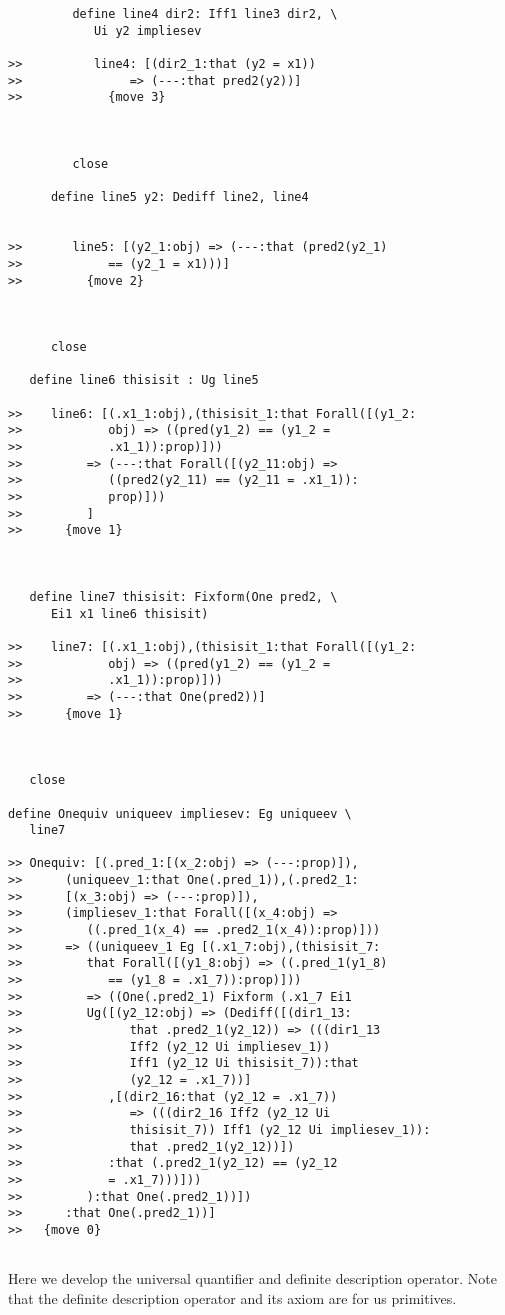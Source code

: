 \documentclass[12pt]{article}
\begin{document}
\begin{verbatim}
         define line4 dir2: Iff1 line3 dir2, \
            Ui y2 impliesev

>>          line4: [(dir2_1:that (y2 = x1))
>>               => (---:that pred2(y2))]
>>            {move 3}



         close

      define line5 y2: Dediff line2, line4


>>       line5: [(y2_1:obj) => (---:that (pred2(y2_1)
>>            == (y2_1 = x1)))]
>>         {move 2}



      close

   define line6 thisisit : Ug line5

>>    line6: [(.x1_1:obj),(thisisit_1:that Forall([(y1_2:
>>            obj) => ((pred(y1_2) == (y1_2 =
>>            .x1_1)):prop)]))
>>         => (---:that Forall([(y2_11:obj) =>
>>            ((pred2(y2_11) == (y2_11 = .x1_1)):
>>            prop)]))
>>         ]
>>      {move 1}



   define line7 thisisit: Fixform(One pred2, \
      Ei1 x1 line6 thisisit)

>>    line7: [(.x1_1:obj),(thisisit_1:that Forall([(y1_2:
>>            obj) => ((pred(y1_2) == (y1_2 =
>>            .x1_1)):prop)]))
>>         => (---:that One(pred2))]
>>      {move 1}



   close

define Onequiv uniqueev impliesev: Eg uniqueev \
   line7

>> Onequiv: [(.pred_1:[(x_2:obj) => (---:prop)]),
>>      (uniqueev_1:that One(.pred_1)),(.pred2_1:
>>      [(x_3:obj) => (---:prop)]),
>>      (impliesev_1:that Forall([(x_4:obj) =>
>>         ((.pred_1(x_4) == .pred2_1(x_4)):prop)]))
>>      => ((uniqueev_1 Eg [(.x1_7:obj),(thisisit_7:
>>         that Forall([(y1_8:obj) => ((.pred_1(y1_8)
>>            == (y1_8 = .x1_7)):prop)]))
>>         => ((One(.pred2_1) Fixform (.x1_7 Ei1
>>         Ug([(y2_12:obj) => (Dediff([(dir1_13:
>>               that .pred2_1(y2_12)) => (((dir1_13
>>               Iff2 (y2_12 Ui impliesev_1))
>>               Iff1 (y2_12 Ui thisisit_7)):that
>>               (y2_12 = .x1_7))]
>>            ,[(dir2_16:that (y2_12 = .x1_7))
>>               => (((dir2_16 Iff2 (y2_12 Ui
>>               thisisit_7)) Iff1 (y2_12 Ui impliesev_1)):
>>               that .pred2_1(y2_12))])
>>            :that (.pred2_1(y2_12) == (y2_12
>>            = .x1_7)))]))
>>         ):that One(.pred2_1))])
>>      :that One(.pred2_1))]
>>   {move 0}


\end{verbatim}

Here we develop the universal quantifier and definite description operator.  Note that the definite description operator and its axiom are for us primitives.
\end{document}

